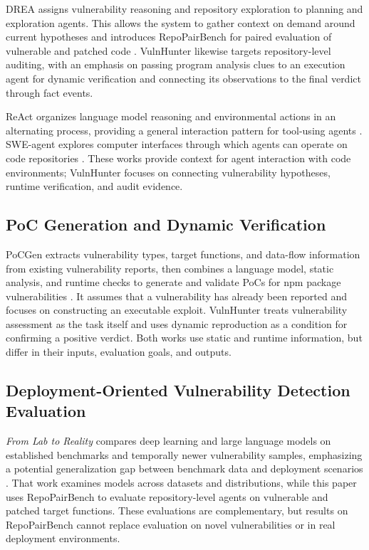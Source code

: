 \documentclass[10pt,a4paper]{article}
\begin{document}
DREA assigns vulnerability reasoning and repository exploration to planning and exploration agents. This allows the system to gather context on demand around current hypotheses and introduces RepoPairBench for paired evaluation of vulnerable and patched code \cite{sun2026drea}. VulnHunter likewise targets repository-level auditing, with an emphasis on passing program analysis clues to an execution agent for dynamic verification and connecting its observations to the final verdict through fact events.

ReAct organizes language model reasoning and environmental actions in an alternating process, providing a general interaction pattern for tool-using agents \cite{yao2022react}. SWE-agent explores computer interfaces through which agents can operate on code repositories \cite{yang2024swe}. These works provide context for agent interaction with code environments; VulnHunter focuses on connecting vulnerability hypotheses, runtime verification, and audit evidence.

\subsection{PoC Generation and Dynamic Verification}

PoCGen extracts vulnerability types, target functions, and data-flow information from existing vulnerability reports, then combines a language model, static analysis, and runtime checks to generate and validate PoCs for npm package vulnerabilities \cite{simsek2026pocgen}. It assumes that a vulnerability has already been reported and focuses on constructing an executable exploit. VulnHunter treats vulnerability assessment as the task itself and uses dynamic reproduction as a condition for confirming a positive verdict. Both works use static and runtime information, but differ in their inputs, evaluation goals, and outputs.

\subsection{Deployment-Oriented Vulnerability Detection Evaluation}

\emph{From Lab to Reality} compares deep learning and large language models on established benchmarks and temporally newer vulnerability samples, emphasizing a potential generalization gap between benchmark data and deployment scenarios \cite{lu2025lab}. That work examines models across datasets and distributions, while this paper uses RepoPairBench to evaluate repository-level agents on vulnerable and patched target functions. These evaluations are complementary, but results on RepoPairBench cannot replace evaluation on novel vulnerabilities or in real deployment environments.
\end{document}
